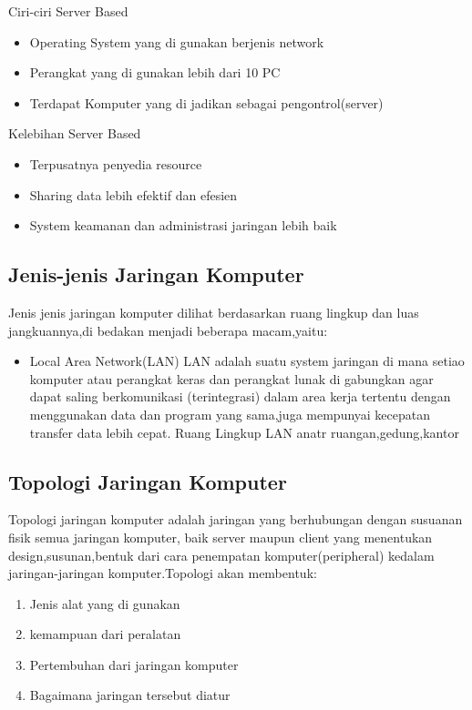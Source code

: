 Ciri-ciri Server Based
\begin{itemize}
  \item Operating System yang di gunakan berjenis network
  \item Perangkat yang di gunakan lebih dari 10 PC
  \item Terdapat Komputer yang di jadikan sebagai pengontrol(server)
\end{itemize}

Kelebihan Server Based
\begin{itemize}
  \item Terpusatnya penyedia resource
  \item Sharing data lebih efektif dan efesien
  \item System keamanan dan administrasi jaringan lebih baik
\end{itemize}

\subsection {Jenis-jenis Jaringan Komputer}
 Jenis jenis jaringan komputer dilihat berdasarkan ruang lingkup dan luas jangkuannya,di bedakan menjadi beberapa macam,yaitu:
\begin{itemize}
  \item Local Area Network(LAN)
   LAN adalah suatu system jaringan di mana setiao komputer atau perangkat keras dan perangkat lunak di gabungkan agar dapat saling berkomunikasi (terintegrasi) dalam area kerja tertentu dengan menggunakan data dan program yang sama,juga mempunyai kecepatan transfer data lebih cepat. Ruang Lingkup LAN anatr ruangan,gedung,kantor
\end{itemize}

\subsection {Topologi Jaringan Komputer}
    Topologi jaringan komputer adalah jaringan yang berhubungan dengan susuanan fisik semua jaringan komputer, baik server maupun client yang menentukan design,susunan,bentuk dari cara penempatan komputer(peripheral) kedalam jaringan-jaringan komputer.Topologi akan membentuk:
\begin{enumerate}
  \item Jenis alat yang di gunakan
  \item kemampuan dari peralatan
  \item Pertembuhan dari jaringan komputer
  \item Bagaimana jaringan tersebut diatur
\end{enumerate}

